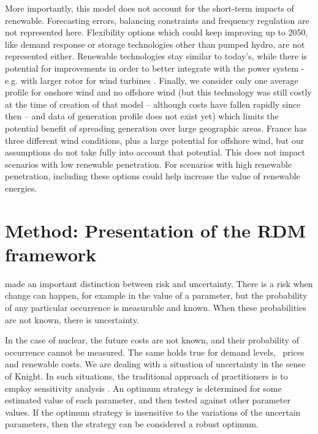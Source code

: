 More importantly, this model does not account for the short-term impacts of renewable. Forecasting errors, balancing constraints and frequency regulation are not represented here. Flexibility options which could keep improving up to 2050, like demand response or storage technologies other than pumped hydro, are not represented either. Renewable technologies stay similar to today's, while there is potential for improvements in order to better integrate with the power system - e.g. with larger rotor for wind turbines \citep{Hirth2016}. Finally, we consider only one average profile for onshore wind and no offshore wind (but this technology was still costly at the time of creation of that model -- although costs have fallen rapidly since then \citep[p.14]{IRENA2017a} -- and data of generation profile does not exist yet) which limits the potential benefit of spreading generation over large geographic areas. France has three different wind conditions, plus a large potential for offshore wind, but our assumptions do not take fully into account that potential.
This does not impact scenarios with low renewable penetration. For scenarios with high renewable penetration, including these options could help increase the value of renewable energies.




\section{Method: Presentation of the RDM framework}
\label{sec:method}

\citet{Knight1921} made an important distinction between risk and uncertainty. There is a risk when change can happen, for example in the value of a parameter, but the probability of any particular occurrence is measurable and known. When these probabilities are not known, there is uncertainty. 

In the case of nuclear, the future costs are not known, and their probability of occurrence cannot be measured. The same holds true for demand levels, \coo\ prices and renewable costs. We are dealing with a situation of uncertainty in the sense of Knight. In such situations, the traditional approach of practitioners is to employ sensitivity analysis \citep{Saltelli2000}. An optimum strategy is determined for some estimated value of each parameter, and then tested against other parameter values. If the optimum strategy is insensitive to the variations of the uncertain parameters, then the strategy can be considered a robust optimum.

